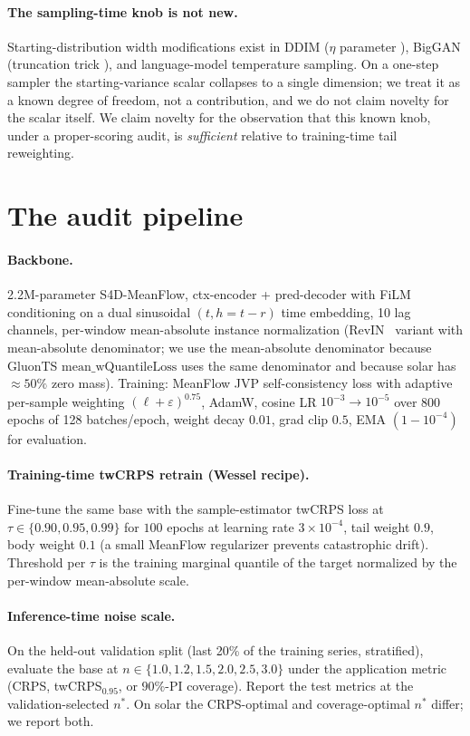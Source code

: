 \documentclass{article}
\begin{document}
\paragraph{The sampling-time knob is not new.} Starting-distribution
width modifications exist in DDIM ($\eta$
parameter \cite{ddim}), BigGAN (truncation trick \cite{biggan}), and
language-model temperature sampling. On a one-step sampler the
starting-variance scalar collapses to a single dimension; we treat it
as a known degree of freedom, not a contribution, and we do not
claim novelty for the scalar itself. We claim novelty for the
observation that this known knob, under a proper-scoring audit, is
\emph{sufficient} relative to training-time tail reweighting.

\section{The audit pipeline}
\label{sec:audit}

\paragraph{Backbone.} 2.2M-parameter S4D-MeanFlow, ctx-encoder + pred-decoder
with FiLM conditioning on a dual sinusoidal $(t, h=t-r)$ time
embedding, 10 lag channels, per-window mean-absolute instance
normalization (RevIN~\cite{revin} variant with mean-absolute
denominator; we use the mean-absolute denominator because GluonTS
$\mathrm{mean\_wQuantileLoss}$ uses the same denominator and because
solar has $\approx 50\%$ zero mass). Training: MeanFlow JVP
self-consistency loss with adaptive per-sample weighting
$(\ell + \varepsilon)^{0.75}$, AdamW, cosine LR $10^{-3} \to 10^{-5}$
over 800 epochs of 128 batches/epoch, weight decay $0.01$, grad clip
$0.5$, EMA $(1 - 10^{-4})$ for evaluation.

\paragraph{Training-time twCRPS retrain (Wessel recipe).} Fine-tune
the same base with the sample-estimator twCRPS loss at
$\tau \in \{0.90, 0.95, 0.99\}$ for $100$ epochs at learning rate
$3 \times 10^{-4}$, tail weight $0.9$, body weight $0.1$ (a small
MeanFlow regularizer prevents catastrophic drift). Threshold per $\tau$
is the training marginal quantile of the target normalized by the
per-window mean-absolute scale.

\paragraph{Inference-time noise scale.} On the held-out validation
split (last 20\% of the training series, stratified), evaluate the
base at $n \in \{1.0, 1.2, 1.5, 2.0, 2.5, 3.0\}$ under the
application metric (CRPS, twCRPS$_{0.95}$, or $90\%$-PI coverage).
Report the test metrics at the validation-selected $n^*$. On solar
the CRPS-optimal and coverage-optimal $n^*$ differ; we report both.
\end{document}
